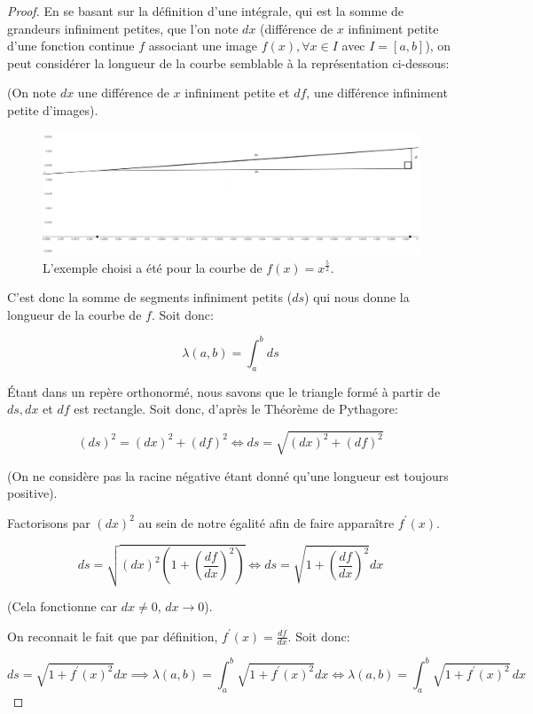 \documentclass[a4paper]{amsart}
\theoremstyle{definition}
\theoremstyle{remark}
\numberwithin{equation}{section}
\begin{document}
\begin{proof}
  En se basant sur la définition d'une intégrale, qui est la somme de grandeurs infiniment petites, que l'on note $dx$ (différence de $x$ infiniment petite d'une fonction continue $f$ associant une image $f(x), \forall x\in I$ avec $I=[a,b]$), on peut considérer la longueur de la courbe semblable à la représentation ci-dessous: 
  
  (On note $dx$ une différence de $x$ infiniment petite et $df$, une différence infiniment petite d'images).

  \begin{figure}[H]
    \centering
    \includegraphics[scale=0.2]{images/curve.png}
    \caption{L'exemple choisi a été pour la courbe de $f(x)=x^{\frac{5}{2}}$.}
  \end{figure}

  C'est donc la somme de segments infiniment petits ($ds$) qui nous donne la longueur de la courbe de $f$. Soit donc:

  \[\lambda(a,b)=\int_{a}^{b}ds\]

  Étant dans un repère orthonormé, nous savons que le triangle formé à partir de $ds, dx$ et $df$ est rectangle. Soit donc, d'après le Théorème de Pythagore:

  \[(ds)^2=(dx)^2+(df)^2 \Leftrightarrow ds=\sqrt{(dx)^2+(df)^2}\]

  (On ne considère pas la racine négative étant donné qu'une longueur est toujours positive).

  Factorisons par $(dx)^2$ au sein de notre égalité afin de faire apparaître $f^\prime(x)$.

  \[ds = \sqrt{(dx)^2(1+(\frac{df}{dx})^2)} \Leftrightarrow ds = \sqrt{1+(\frac{df}{dx})^2}dx\]

  (Cela fonctionne car $dx\ne0$, $dx\to 0$).

  On reconnait le fait que par définition, $f^\prime(x)=\frac{df}{dx}$. Soit donc: 

  \[ds=\sqrt{1+{f^\prime}(x)^2}dx \implies \lambda(a,b)=\int_{a}^{b}\sqrt{1+{f^\prime}(x)^2}dx \Leftrightarrow \lambda(a,b)=\int_{a}^{b}\sqrt{1+{f^\prime}(x)^2}\,dx\]
\end{proof}
\end{document}
